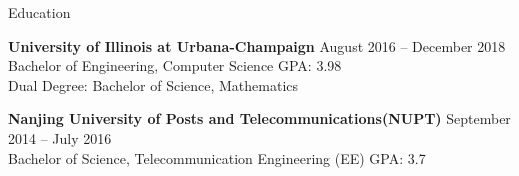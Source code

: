 \documentclass{resume} %
\begin{document}

\begin{rSection}{Education}

{\bf University of Illinois at Urbana-Champaign} \hfill {August 2016 -- December 2018} \\
Bachelor of Engineering, Computer Science \hfill GPA: 3.98 \\
Dual Degree: Bachelor of Science, Mathematics

{\bf Nanjing University of Posts and Telecommunications(NUPT)} \hfill {September 2014 -- July 2016} \\
Bachelor of Science, Telecommunication Engineering (EE) \hfill GPA: 3.7

\end{rSection}

\end{document}

